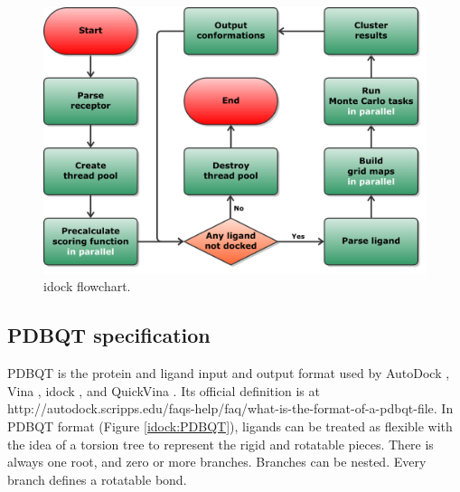 \begin{figure}
\centering
\includegraphics[width=\linewidth]{../idock/Flowchart.pdf}
\caption{idock flowchart.}
\label{idock:Flowchart}
\end{figure}

\subsection{PDBQT specification}

PDBQT is the protein and ligand input and output format used by AutoDock \citep{597,596}, Vina \citep{595}, idock \citep{1153}, and QuickVina \citep{1193}. Its official definition is at http://autodock.scripps.edu/faqs-help/faq/what-is-the-format-of-a-pdbqt-file. In PDBQT format (Figure \ref{idock:PDBQT}), ligands can be treated as flexible with the idea of a torsion tree to represent the rigid and rotatable pieces. There is always one root, and zero or more branches. Branches can be nested. Every branch defines a rotatable bond.

